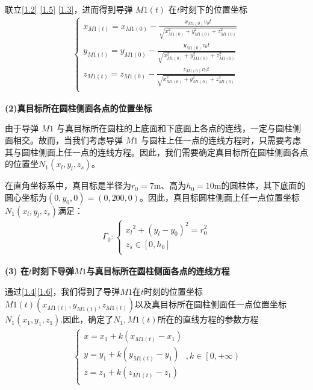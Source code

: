\documentclass[../main.tex]{subfiles}
\begin{document}
\par 联立\eqref{1.2} \eqref{1.5} \eqref{1.3}，进而得到导弹 \( M1(t) \) 在$t$时刻下的位置坐标
\begin{align}\label{1.4}
\left\{ \begin{array}{l}
x_{M1(t)}=x_{M1(0)}-\frac{x_{M1(0)}v_0t}{\sqrt{x_{M1(0)}^{2}+y_{M1(0)}^{2}+z_{M1(0)}^{2}}}\\
y_{M1(t)}=y_{M1(0)}-\frac{y_{M1(0)}v_0t}{\sqrt{x_{M1(0)}^{2}+y_{M1(0)}^{2}+z_{M1(0)}^{2}}}\\
z_{M1(t)}=z_{M1(0)}-\frac{z_{M1(0)}v_0t}{\sqrt{x_{M1(0)}^{2}+y_{M1(0)}^{2}+z_{M1(0)}^{2}}}\\
\end{array} \right. 
\end{align}


\noindent\textbf{(2)真目标所在圆柱侧面各点的位置坐标}
\par 由于导弹 \( M1 \) 与真目标所在圆柱的上底面和下底面上各点的连线，一定与圆柱侧面相交。故而，当我们考虑导弹 \( M1 \) 与圆柱上任一点的连线方程时，只需要考虑其与圆柱侧面上任一点的连线方程。因此，我们需要确定真目标所在圆柱侧面各点的位置坐$N_1\left( x_l,y_l,z_s \right) $。
\par 在直角坐标系中，真目标是半径为$r_0=7$m、高为$h_0=10$m的圆柱体，其下底面的圆心坐标为$\left( 0,y_0 ,0\right) = (0,200,0)$。因此，真目标圆柱侧面上任一点位置坐标$N_1\left( x_l,y_l,z_s \right) $满足：
\begin{align}\label{1.6}
\varGamma _0:\begin{cases}
{x_l}^2+\left( y_l-y_0 \right) ^2=r_{0}^{2}\\
z_s\in \left[ 0,h_0 \right]\\
\end{cases}
\end{align}



\noindent\textbf{(3) 在\( t \)时刻下导弹\( M1 \)与真目标所在圆柱侧面各点的连线方程}
\par 通过\eqref{1.4}\eqref{1.6}，我们得到了导弹$M1$在\( t \)时刻的位置坐标\( M1(t)(x_{M1(t)}, y_{M1(t)}, z_{M1(t)}) \)以及真目标所在圆柱侧面任一点位置坐标$N_1\left( x_1,y_1,z_1 \right) $.因此，确定了$N_1,M1(t)$所在的直线方程的参数方程
\begin{align}\label{1.7}
\begin{cases}
x=x_1+k\left( x_{M1(t)}-x_1 \right)\\
y=y_1+k\left( y_{M1(t)}-y_1 \right)\\
z=z_1+k\left( z_{M1(t)}-z_1 \right)\\
\end{cases},k\in \left[ 0,+\infty \right) 
\end{align}
\end{document}

